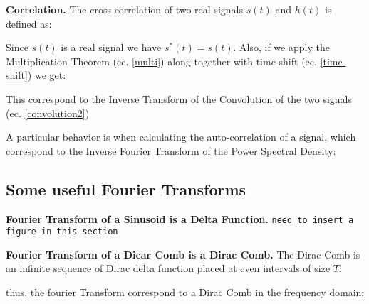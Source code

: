 \begin{description}
	
	\item \textbf{Correlation.} The cross-correlation of two real signals $s(t)$ and $h(t)$ is defined as:
	

	\newp Since $s(t)$ is a real signal we have $s^{*}(t) = s(t)$. Also, if we apply the Multiplication Theorem (ec. \ref{multi}) along together with time-shift (ec. \ref{time-shift}) we get:
	
	
	\newp This correspond to the Inverse Transform of the Convolution of the two signals (ec. \ref{convolution2})
	
	
	\newp A particular behavior is when calculating the auto-correlation of a signal, which correspond to the Inverse Fourier Transform of the Power Spectral Density:
	
	 
\end{description}

\subsection{Some useful Fourier Transforms}{\label{subsec_ftusefull}}
\begin{description}
	\item \textbf{Fourier Transform of a Sinusoid is a Delta Function.} \texttt{need to insert a figure in this section}
	
	\item \textbf{Fourier Transform of a Dicar Comb is a Dirac Comb.} The Dirac Comb is an infinite sequence of Dirac delta function placed at even intervals of size $T$:	

	
	thus, the fourier Transform correspond to a Dirac Comb in the frequency domain:
	

\end{description}

